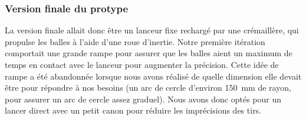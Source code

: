 \subsubsection{Version finale du protype}
La version finale allait donc être un lanceur fixe rechargé par une crémaillère, qui propulse les balles à l’aide d’une roue d’inertie.
Notre première itération comportait une grande rampe pour assurer que les balles aient un maximum de temps en contact avec le lanceur pour augmenter la précision.
Cette idée de rampe a été abandonnée lorsque nous avons réalisé de quelle dimension elle devait être pour répondre à nos besoins (un arc de cercle d’environ 150~mm de rayon, pour assurer un arc de cercle assez graduel).
Nous avons donc optés pour un lancer direct avec un petit canon pour réduire les imprécisions des tirs.

